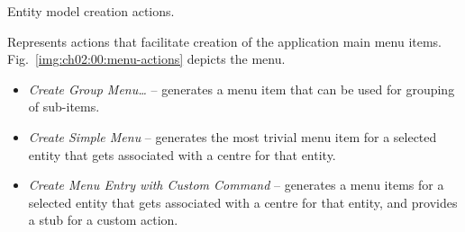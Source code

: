 \begin{description}
\begin{image}{Entity model creation actions.}{\label{img:ch02:00:model-actions}}
    \end{image}
    
    
    \item[\textbf{TG Menu Actions.}] Represents actions that facilitate creation of the application main menu items.
    Fig.~\ref{img:ch02:00:menu-actions} depicts the menu.
    
    \begin{itemize}
     \item \emph{Create Group Menu\ldots} -- generates a menu item that can be used for grouping of sub-items.
     \item \emph{Create Simple Menu} -- generates the most trivial menu item for a selected entity that gets associated with a centre for that entity.
     \item \emph{Create Menu Entry with Custom Command} -- generates a menu items for a selected entity that gets associated with a centre for that entity, and provides a stub for a custom action.
    \end{itemize}


\end{description}
